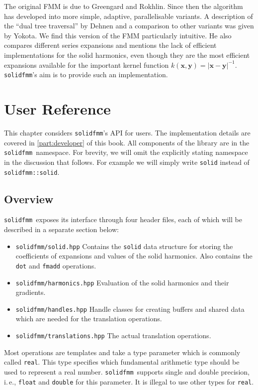 \documentclass{scrbook}
\newcommand{\solidfmm}{\texttt{solidfmm}}
\newcommand{\vv}[1]{\ensuremath{\symbf{#1}}} %
\begin{document}
The original FMM is due to Greengard and Rokhlin.\autocite{greengard1987}
Since then the algorithm has developed into more simple, adaptive,
parallelisable variants. A description of the \enquote{dual tree traversal}
by Dehnen\autocite{dehnen2002} and a comparison to other variants was given by
Yokota.\autocite{yokota2013b} We find this version of the FMM particularly
intuitive. He also compares different series expansions and mentions the lack
of efficient implementations for the solid harmonics, even though they are
the most efficient expansions available for the important kernel function
$k(\vv{x},\vv{y})=|\vv{x}-\vv{y}|^{-1}$. \solidfmm's aim is to provide such an
implementation.



\chapter{User Reference}\label{chp:userreference}
This chapter considers \solidfmm's API for users. The implementation details
are covered in \cref{part:developer} of this book. All components of the library
are in the \solidfmm\ namespace. For brevity, we will omit the explicitly
stating namespace in the discussion that follows. For example we will simply
write \lstinline|solid| instead of \lstinline|solidfmm::solid|.

\section{Overview}
\solidfmm\ exposes its interface through four header files, each of which
will be described in a separate section below:
\begin{itemize}
\item \lstinline|solidfmm/solid.hpp| Contains the \lstinline|solid| data
structure for storing the coefficients of expansions and values of the
solid harmonics. Also contains the \lstinline|dot| and \lstinline|fmadd|
operations.
\item \lstinline|solidfmm/harmonics.hpp| Evaluation of the solid harmonics
and their gradients.
\item \lstinline|solidfmm/handles.hpp| Handle classes for creating buffers
and shared data which are needed for the translation operations.
\item \lstinline|solidfmm/translations.hpp| The actual translation operations.
\end{itemize}

Most operations are templates and take a type parameter which is commonly
called \lstinline|real|. This type specifies which fundamental arithmetic
type should be used to represent a real number. \solidfmm\ supports single and
double precision, i.\,e., \lstinline|float| and \lstinline|double| for this
parameter. It is illegal to use other types for \lstinline|real|.
\end{document}
